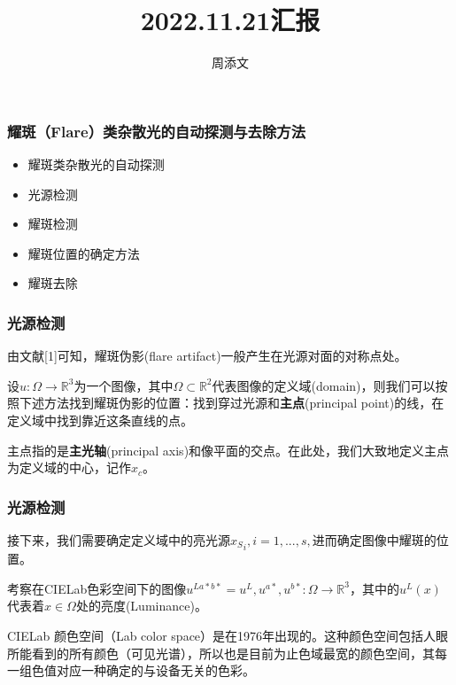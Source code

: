 \documentclass{beamer}
\title[2022.11.21日汇报] %
{2022.11.21汇报}
\author[周添文] %
{周添文\inst{} }
\institute[] %
{
  \inst{}%
  数学科学学院\\
  北京师范大学\\
}
\date[2022.11.21] %
\begin{document}
\frame{\titlepage}
\begin{frame}
\frametitle{耀斑（Flare）类杂散光的自动探测与去除方法}

\begin{itemize}
\item 耀斑类杂散光的自动探测
\item 光源检测
\item 耀斑检测
\item 耀斑位置的确定方法
\item 耀斑去除
\end{itemize}




\end{frame}
\begin{frame}
\frametitle{光源检测}

由文献[1]可知，耀斑伪影(flare artifact)一般产生在光源对面的对称点处。\pause


设$u:\Omega \rightarrow \mathbb{R}^3$为一个图像，其中$\Omega \subset \mathbb{R}^2$代表图像的定义域(domain)，则我们可以按照下述方法找到耀斑伪影的位置：找到穿过光源和\textbf{主点}(principal point)的线，在定义域中找到靠近这条直线的点。\pause


主点指的是\textbf{主光轴}(principal axis)和像平面的交点。在此处，我们大致地定义主点为定义域的中心，记作$x_c$。
\end{frame}
\begin{frame}
\frametitle{光源检测}
接下来，我们需要确定定义域中的亮光源${x_S}_i,i=1,...,s,$进而确定图像中耀斑的位置。\pause


考察在CIELab色彩空间下的图像$u^{La*b*}=u^L,u^{a*},u^{b*}:\Omega \rightarrow \mathbb{R}^3$，其中的$u^L(x)$代表着$x\in \Omega$处的亮度(Luminance)。\pause

CIELab 颜色空间（Lab color space）是在1976年出现的。这种颜色空间包括人眼所能看到的所有颜色（可见光谱），所以也是目前为止色域最宽的颜色空间，其每一组色值对应一种确定的与设备无关的色彩。\pause
\end{frame}
\end{document}
